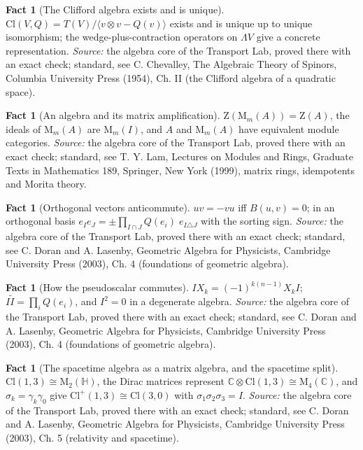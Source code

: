 \documentclass[11pt]{article}
\theoremstyle{definition}
\newtheorem{fact}[theorem]{Fact}
\theoremstyle{plain}
\providecommand{\C}{}\renewcommand{\C}{\mathbb{C}}
\providecommand{\Cl}{}\renewcommand{\Cl}{\mathrm{Cl}}
\providecommand{\HH}{}\renewcommand{\HH}{\mathbb{H}}
\providecommand{\Mat}{}\renewcommand{\Mat}{\mathrm{M}}
\providecommand{\Zc}{}\renewcommand{\Zc}{\mathrm{Z}}
\begin{document}
\begin{fact}[The Clifford algebra exists and is unique]\label{c:std-algebra.existence-uniqueness}
$\Cl(V, Q) = T(V)/\langle v \otimes v - Q(v) \rangle$ exists and is unique up to unique isomorphism; the wedge-plus-contraction operators on $\Lambda V$ give a concrete representation.
\emph{Source:} the algebra core of the Transport Lab, proved there with an exact check; standard, see C. Chevalley, The Algebraic Theory of Spinors, Columbia University Press (1954), Ch. II (the Clifford algebra of a quadratic space).
\end{fact}

\begin{fact}[An algebra and its matrix amplification]\label{c:std-algebra.morita-amplification}
$\Zc(\Mat_m(A)) = \Zc(A)$, the ideals of $\Mat_m(A)$ are $\Mat_m(I)$, and $A$ and $\Mat_m(A)$ have equivalent module categories.
\emph{Source:} the algebra core of the Transport Lab, proved there with an exact check; standard, see T. Y. Lam, Lectures on Modules and Rings, Graduate Texts in Mathematics 189, Springer, New York (1999), matrix rings, idempotents and Morita theory.
\end{fact}

\begin{fact}[Orthogonal vectors anticommute]\label{c:std-algebra.orthogonal-anticommute}
$uv = -vu$ iff $B(u,v) = 0$; in an orthogonal basis $e_I e_J = \pm \prod_{I \cap J} Q(e_i)\; e_{I \triangle J}$ with the sorting sign.
\emph{Source:} the algebra core of the Transport Lab, proved there with an exact check; standard, see C. Doran and A. Lasenby, Geometric Algebra for Physicists, Cambridge University Press (2003), Ch. 4 (foundations of geometric algebra).
\end{fact}

\begin{fact}[How the pseudoscalar commutes]\label{c:std-algebra.pseudoscalar-commutation}
$I X_k = (-1)^{k(n-1)} X_k I$; $I\tilde{I} = \prod_i Q(e_i)$, and $I^{2} = 0$ in a degenerate algebra.
\emph{Source:} the algebra core of the Transport Lab, proved there with an exact check; standard, see C. Doran and A. Lasenby, Geometric Algebra for Physicists, Cambridge University Press (2003), Ch. 4 (foundations of geometric algebra).
\end{fact}

\begin{fact}[The spacetime algebra as a matrix algebra, and the spacetime split]\label{c:std-algebra.sta-matrix}
$\Cl(1,3) \cong \Mat_2(\HH)$, the Dirac matrices represent $\C \otimes \Cl(1,3) \cong \Mat_4(\C)$, and $\sigma_k = \gamma_k\gamma_0$ give $\Cl^{+}(1,3) \cong \Cl(3,0)$ with $\sigma_1\sigma_2\sigma_3 = I$.
\emph{Source:} the algebra core of the Transport Lab, proved there with an exact check; standard, see C. Doran and A. Lasenby, Geometric Algebra for Physicists, Cambridge University Press (2003), Ch. 5 (relativity and spacetime).
\end{fact}
\end{document}
